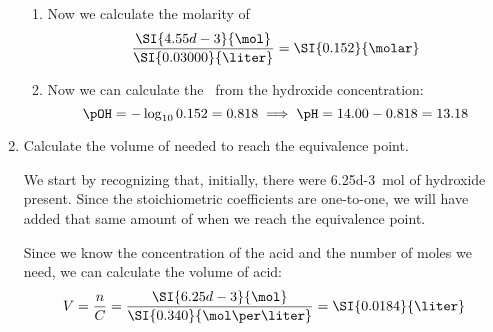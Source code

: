 \documentclass[../mit-general-chemistry.tex]{subfiles}
\begin{document}
\begin{example}
\begin{enumerate}[label=\arabic*)]
\begin{enumerate}[label=\alph*)]
    \item Now we calculate the molarity of \hydroxide
      \begin{equation*}
        \frac{\SI{4.55d-3}{\mol}}{\SI{0.03000}{\liter}} =
        \SI{0.152}{\molar}
      \end{equation*}

    \item Now we can calculate the \pH\ from the hydroxide
      concentration:
      \begin{equation*}
        \pOH = - \log_{10} 0.152 = 0.818 \implies \pH = 14.00 - 0.818 = 13.18
      \end{equation*}
    \end{enumerate}

  \item Calculate the volume of  needed to reach the
    equivalence point.

    We start by recognizing that, initially, there were
    \SI{6.25d-3}{\mol} of hydroxide present. Since the stoichiometric
    coefficients are one-to-one, we will have added that same amount
    of  when we reach the equivalence point.

    Since we know the concentration of the acid and the number of
    moles we need, we can calculate the volume of acid:
    \begin{equation*}
      V = \frac{n}{C}
      = \frac{\SI{6.25d-3}{\mol}}{\SI{0.340}{\mol\per\liter}}
      = \SI{0.0184}{\liter}
    \end{equation*}
  \end{enumerate}
\end{example}
\end{document}
